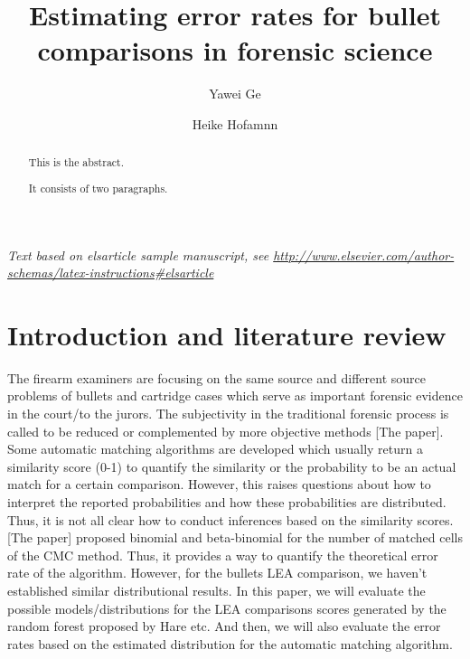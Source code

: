 \documentclass[]{elsarticle} %
\begin{document}
\begin{frontmatter}

  \title{Estimating error rates for bullet comparisons in forensic science}
    \author[Iowa State Univeristy]{Yawei Ge}
    \author[Iowa State Univeristy]{Heike Hofamnn}
      \address[Some Institute of Technology]{Department, Street, City, State, Zip}
    \address[Another University]{Department, Street, City, State, Zip}
    
  \begin{abstract}
  This is the abstract.
  
  It consists of two paragraphs.
  \end{abstract}
  
 \end{frontmatter}

\emph{Text based on elsarticle sample manuscript, see
\url{http://www.elsevier.com/author-schemas/latex-instructions\#elsarticle}}

\hypertarget{introduction-and-literature-review}{%
\section{Introduction and literature
review}\label{introduction-and-literature-review}}

The firearm examiners are focusing on the same source and different
source problems of bullets and cartridge cases which serve as important
forensic evidence in the court/to the jurors. The subjectivity in the
traditional forensic process is called to be reduced or complemented by
more objective methods {[}The paper{]}. Some automatic matching
algorithms are developed which usually return a similarity score (0-1)
to quantify the similarity or the probability to be an actual match for
a certain comparison. However, this raises questions about how to
interpret the reported probabilities and how these probabilities are
distributed. Thus, it is not all clear how to conduct inferences based
on the similarity scores. {[}The paper{]} proposed binomial and
beta-binomial for the number of matched cells of the CMC method. Thus,
it provides a way to quantify the theoretical error rate of the
algorithm. However, for the bullets LEA comparison, we haven't
established similar distributional results. In this paper, we will
evaluate the possible models/distributions for the LEA comparisons
scores generated by the random forest proposed by Hare etc. And then, we
will also evaluate the error rates based on the estimated distribution
for the automatic matching algorithm.
\end{document}

